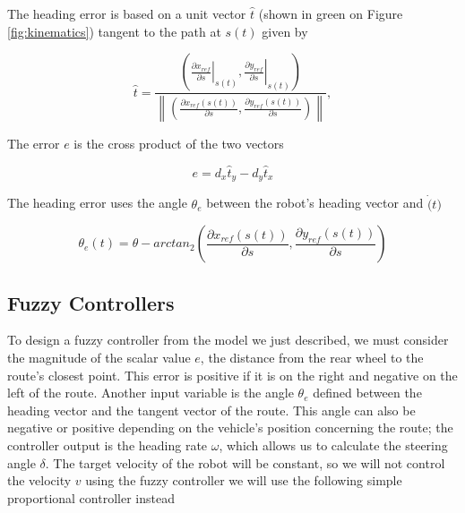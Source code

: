 \documentclass[symmetry,article,submit,moreauthors,pdftex]{Definitions/mdpi}
\begin{document}
The heading error is based on a unit vector $\hat{t}$ (shown in green on Figure
\ref{fig:kinematics}) tangent to the path at $s(t)$ given by 

\begin{equation}
\hat{t} = \frac{ \left(\left.\frac{\partial x_{ref}}{\partial s} \right|_{s(t)},\left.\frac{\partial y_{ref}}{\partial s} \right|_{s(t)}\right)} 
              {\left\| \left(\frac{\partial x_{ref}(s(t))}{\partial s},\frac{\partial y_{ref}(s(t))}{\partial s}\right) \right\|},
\end{equation}

The error $e$ is the cross product of the two vectors

\begin{equation}
e = d_x \hat{t}_y - d_y \hat{t}_x
\end{equation}

The heading error uses the angle $\theta_e$ between the robot's heading vector
and $\dot(t)$

\begin{equation}
\theta_e(t) = \theta - arctan_2 \left( \frac{\partial x_{ref}(s(t))}{\partial s} , \frac{\partial y_{ref}(s(t))}{\partial s} \right)
\end{equation}





\subsection{Fuzzy Controllers}%
    \label{sub:FuzzyControllers}

To design a fuzzy controller from the model we just described, we must consider
the magnitude of the scalar value $e$, the distance from the rear wheel to the
route's closest point. This error is positive if it is on the right and
negative on the left of the route. Another input variable is the angle
$\theta_e$ defined between the heading vector and the tangent vector of the
route. This angle can also be negative or positive depending on the vehicle's
position concerning the route; the controller output is the heading rate
$\omega$, which allows us to calculate the steering angle $\delta$. The target
velocity of the robot will be constant, so we will not control the
velocity $v$ using the fuzzy controller we will use the following simple
proportional controller instead
\end{document}
